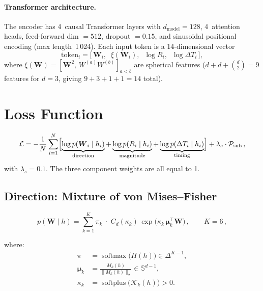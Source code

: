 \documentclass[11pt,a4paper]{article}
\newcommand{\bW}{\boldsymbol{W}}
\newcommand{\bmu}{\boldsymbol{\mu}}
\DeclareMathOperator{\softmax}{softmax}
\DeclareMathOperator{\softplus}{softplus}
\begin{document}
\paragraph{Transformer architecture.}
The encoder has 4~causal Transformer layers with
$d_{\text{model}} = 128$, 4~attention heads, feed-forward dim $= 512$,
dropout $= 0.15$, and sinusoidal positional encoding
(max length~1\,024).
Each input token is a 14-dimensional vector
\[
  \text{token}_i
  = \bigl[\,\bW_i,\;\; \xi(\bW_i),\;\; \log R_i,\;\; \log \Delta T_i\,\bigr],
\]
where $\xi(\bW) = [\bW^2,\, W^{(a)}W^{(b)}]_{a<b}$ are spherical
features ($d + d + \binom{d}{2} = 9$ features for $d=3$, giving
$9 + 3 + 1 + 1 = 14$ total).

\section{Loss Function}\label{sec:loss}

\begin{equation}\label{eq:loss}
  \mathcal{L}
  = -\frac{1}{N}\sum_{i=1}^{N}
    \Bigl[
      \underbrace{\log p(\bW_i \mid h_i)}_{\text{direction}}
    + \underbrace{\log p(R_i \mid h_i)}_{\text{magnitude}}
    + \underbrace{\log p(\Delta T_i \mid h_i)}_{\text{timing}}
    \Bigr]
  + \lambda_s \cdot \mathcal{P}_{\text{sub}}\,,
\end{equation}
with $\lambda_s = 0.1$.  The three component weights are all equal to 1.

\subsection{Direction: Mixture of von Mises--Fisher}

\begin{equation}\label{eq:vmf}
  p(\bW \mid h)
  = \sum_{k=1}^{K} \pi_k \;\cdot\; C_d(\kappa_k)\,
    \exp\!\bigl(\kappa_k\,\bmu_k^\top \bW\bigr)\,,
  \qquad K = 6\,,
\end{equation}

where:
\begin{align}
  \pi &= \softmax\!\bigl(\Pi(h)\bigr)
       \in \Delta^{K-1}, \label{eq:pi} \\[2pt]
  \bmu_k &= \frac{M_k(h)}{\|M_k(h)\|_2}
       \in \mathbb{S}^{d-1}, \label{eq:mu} \\[2pt]
  \kappa_k &= \softplus\!\bigl(\mathcal{K}_k(h)\bigr) > 0. \label{eq:kappa}
\end{align}
\end{document}
